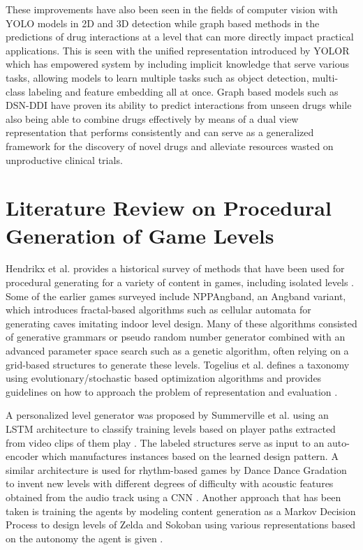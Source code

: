 \documentclass{Configuration_Files/PoliMi3i_thesis}
\begin{document}
These improvements have also been seen in the fields of computer vision with YOLO models in 2D 
and 3D detection while graph based methods in the predictions of drug interactions at a level that 
can more directly impact practical applications. This is seen with the unified representation introduced 
by YOLOR \cite{ChW21} which has empowered system by including implicit knowledge that serve various 
tasks, allowing models to learn multiple tasks such as object detection, multi-class labeling and feature embedding 
all at once. Graph based models such as DSN-DDI \cite{ZiL23} have proven its ability to predict interactions from 
unseen drugs while also being able to combine drugs effectively by means of a dual view representation that 
performs consistently and can serve as a generalized framework for the discovery of novel drugs and alleviate 
resources wasted on unproductive clinical trials.

\section{Literature Review on Procedural Generation of Game Levels}
Hendrikx et al. provides a historical survey of methods that have been used for 
procedural generating for a variety of content in games, including isolated levels 
\cite{MaH13}. Some of the earlier games surveyed include NPPAngband, an Angband 
variant, which introduces fractal-based algorithms such as cellular automata for generating 
caves imitating indoor level design. Many of these algorithms consisted of generative 
grammars or pseudo random number generator combined with an advanced 
parameter space search such as a genetic algorithm, often relying on a grid-based 
structures to generate these levels. Togelius et al. defines a taxonomy using 
evolutionary/stochastic based optimization algorithms and provides guidelines on 
how to approach the problem of representation and evaluation \cite{JuT11}.

A personalized level generator was proposed by Summerville et al. using an LSTM 
architecture to classify training levels based on player paths extracted from video clips
 of them play \cite{AdS21}. The labeled structures serve as input 
to an auto-encoder which manufactures instances based on the learned design 
pattern. A similar architecture is used for rhythm-based games by Dance Dance 
Gradation to invent new levels with different degrees of difficulty with acoustic 
features obtained from the audio track using a CNN \cite{YuT18}. Another approach that has 
been taken is training the agents by modeling content generation as a Markov 
Decision Process to design levels of Zelda and Sokoban using various representations 
based on the autonomy the agent is given \cite{AhK20}.
\end{document}
